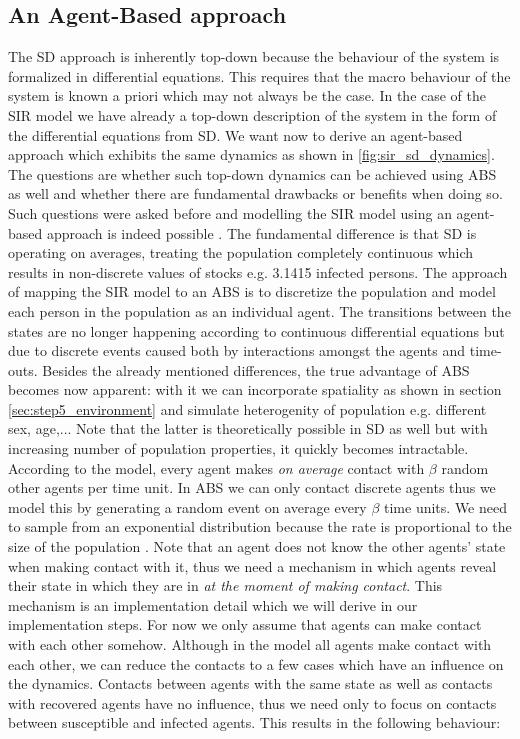 \subsection*{An Agent-Based approach}
The SD approach is inherently top-down because the behaviour of the system is formalized in differential equations. This requires that the macro behaviour of the system is known a priori which may not always be the case. In the case of the SIR model we have already a top-down description of the system in the form of the differential equations from SD. We want now to derive an agent-based approach which exhibits the same dynamics as shown in \ref{fig:sir_sd_dynamics}. 
The questions are whether such top-down dynamics can be achieved using ABS as well and whether there are fundamental drawbacks or benefits when doing so. Such questions were asked before and modelling the SIR model using an agent-based approach is indeed possible \cite{macal_agent-based_2010}. The fundamental difference is that SD is operating on averages, treating the population completely continuous which results in non-discrete values of stocks e.g. 3.1415 infected persons. The approach of mapping the SIR model to an ABS is to discretize the population and model each person in the population as an individual agent. The transitions between the states are no longer happening according to continuous differential equations but due to discrete events caused both by interactions amongst the agents and time-outs. Besides the already mentioned differences, the true advantage of ABS becomes now apparent: with it we can incorporate spatiality as shown in section \ref{sec:step5_environment} and simulate heterogenity of population e.g. different sex, age,... Note that the latter is theoretically possible in SD as well but with increasing number of population properties, it quickly becomes intractable. 
According to the model, every agent makes \textit{on average} contact with $\beta$ random other agents per time unit. In ABS we can only contact discrete agents thus we model this by generating a random event on average every $\beta$ time units. We need to sample from an exponential distribution because the rate is proportional to the size of the population \cite{borshchev_system_2004}. Note that an agent does not know the other agents' state when making contact with it, thus we need a mechanism in which agents reveal their state in which they are in \textit{at the moment of making contact}. This mechanism is an implementation detail which we will derive in our implementation steps. For now we only assume that agents can make contact with each other somehow. 
Although in the model all agents make contact with each other, we can reduce the contacts to a few cases which have an influence on the dynamics. Contacts between agents with the same state as well as contacts with recovered agents have no influence, thus we need only to focus on contacts between susceptible and infected agents. This results in the following behaviour:

